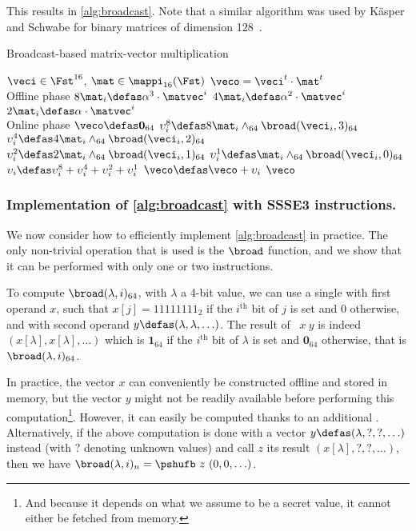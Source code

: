 This results in \autoref{alg:broadcast}. Note that a similar algorithm was used by Käsper and Schwabe for binary
matrices of dimension 128~\cite{DBLP:conf/ches/KasperS09}.

\begin{algorithm}[!htb]
  \caption{Broadcast-based matrix-vector multiplication}
\label{alg:broadcast}
\begin{algorithmic}[1]
  \REQUIRE $\veci \in \Fst^{16}$, $\mat \in \mappi_{16}(\Fst)$
  \ENSURE  $\veco = \veci^t\cdot\mat^t$\\
  Offline phase
  \STATE $8\mat_i \defas \alpha^3\cdot\matvec^i$
  \STATE $4\mat_i \defas \alpha^2\cdot\matvec^i$
  \STATE $2\mat_i \defas \alpha\cdot\matvec^i$
  \ENDFOR\\
  Online phase
  \STATE $\veco \defas \mathbf{0}_{64}$
  \STATE $\upsilon_i^8 \defas 8\mat_i \wedge_{64} \broad(\veci_i,3)_{64}$
  \STATE $\upsilon_i^4 \defas 4\mat_i \wedge_{64} \broad(\veci_i,2)_{64}$
  \STATE $\upsilon_i^2 \defas 2\mat_i \wedge_{64} \broad(\veci_i,1)_{64}$
  \STATE $\upsilon_i^1 \defas  \mat_i \wedge_{64} \broad(\veci_i,0)_{64}$
  \STATE $\upsilon_i \defas \upsilon_i^8 + \upsilon_i^4 + \upsilon_i^2 + \upsilon_i^1$
  \STATE $\veco \defas \veco + \upsilon_i$
  \ENDFOR
  \RETURN $\veco$
\end{algorithmic}
\end{algorithm}


\subsubsection{Implementation of \autoref{alg:broadcast} with SSSE3 instructions.}
We now consider how to efficiently implement \autoref{alg:broadcast} in practice. The only
non-trivial operation that is used is the $\broad$ function, and we show that it can be performed
with only one or two \pshufb{} instructions.

To compute $\broad(\lambda,i)_{64}$, with $\lambda$ a 4-bit value,
we can use a single \pshufb{} with first operand
$x$, such that $x[j] = 11111111_2$ if the $i^\text{th}$ bit of $j$ is set and 0 otherwise, and with second operand $y \defas (\lambda, \lambda, \ldots)$.
The result of \pshufb{}~$x~y$ is indeed $(x[\lambda], x[\lambda], \ldots)$ which is $\mathbf{1}_{64}$ if the $i^\text{th}$
bit of $\lambda$ is set and $\mathbf{0}_{64}$ otherwise, that is $\broad(\lambda, i)_{64}$.

In practice, the vector $x$ can conveniently be constructed offline and stored in memory, but the vector $y$ might not be readily available before
performing this computation\footnote{And because it depends on what we assume to be a secret value, it cannot either be fetched from memory.}.
However, it can easily be computed thanks to an additional \pshufb{}. Alternatively, if the
above computation is done with a vector $y \defas (\lambda, ?, ?, \ldots)$ instead (with $?$ denoting unknown values) and call $z$ its result $(x[\lambda], ?, ?, \ldots)$,
then we have $\broad(\lambda, i)_n = \pshufb~z~ (0, 0, \ldots)$.

